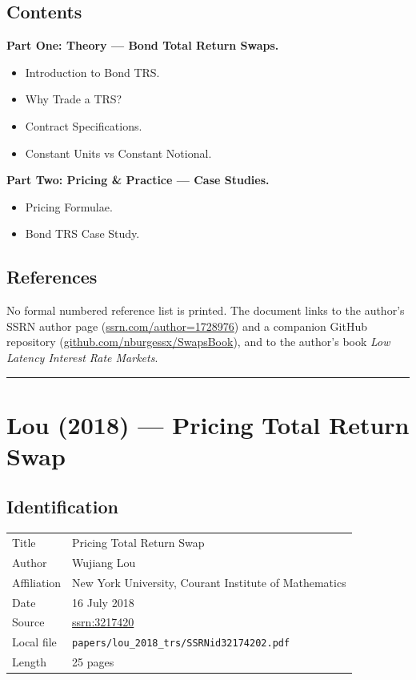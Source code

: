 \documentclass[11pt,a4paper]{article}
\begin{document}
\subsection*{Contents}
\textbf{Part One: Theory --- Bond Total Return Swaps.}
\begin{itemize}[noitemsep]
  \item Introduction to Bond TRS.
  \item Why Trade a TRS?
  \item Contract Specifications.
  \item Constant Units vs Constant Notional.
\end{itemize}
\textbf{Part Two: Pricing \& Practice --- Case Studies.}
\begin{itemize}[noitemsep]
  \item Pricing Formulae.
  \item Bond TRS Case Study.
\end{itemize}

\subsection*{References}
No formal numbered reference list is printed. The document links to
the author's SSRN author page (\url{ssrn.com/author=1728976}) and a
companion GitHub repository (\url{github.com/nburgessx/SwapsBook}),
and to the author's book \emph{Low Latency Interest Rate Markets}.

\bigskip\hrule\bigskip

\section{Lou (2018) --- Pricing Total Return Swap}
\label{bib:lou-2018-trs}

\subsection*{Identification}
\begin{tabular}{@{}p{3.5cm}p{11cm}@{}}
\toprule
Title           & Pricing Total Return Swap \\
Author          & Wujiang Lou \\
Affiliation     & New York University, Courant Institute of Mathematics \\
Date            & 16 July 2018 \\
Source          & \href{https://ssrn.com/abstract=3217420}{ssrn:3217420} \\
Local file      & \texttt{papers/lou\_2018\_trs/SSRNid32174202.pdf} \\
Length          & 25 pages \\
\bottomrule
\end{tabular}
\end{document}
